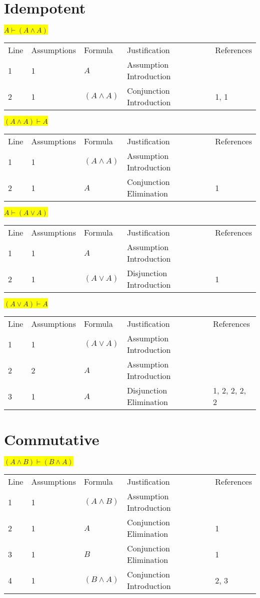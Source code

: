 \documentclass[12pt]{article}
\newcommand{\pr}[1]{\bigbreak \colorbox{Yellow}{$#1$} \smallbreak}
\begin{document}
\begin{flushleft}

\tableofcontents

\clearpage
\section{Idempotent}
\pr{A \vdash(A \land A)}
\begin{tabular}{lllll}
    Line & Assumptions & Formula & Justification & References \\
    1 & 1 & $A$  & Assumption Introduction &  \\
    2 & 1 & $(A\land A)$  & Conjunction Introduction & 1, 1 \\
\end{tabular}

\pr{(A \land A) \vdash A}
\begin{tabular}{lllll}
    Line & Assumptions & Formula & Justification & References \\
    1 & 1 & $(A\land A)$  & Assumption Introduction &  \\
    2 & 1 & $A$  & Conjunction Elimination & 1 \\
\end{tabular}

\pr{A \vdash (A \lor A)}
\begin{tabular}{lllll}
    Line & Assumptions & Formula & Justification & References \\
    1 & 1 & $A$  & Assumption Introduction &  \\
    2 & 1 & $(A\lor A)$  & Disjunction Introduction & 1 \\
\end{tabular}

\pr{(A \lor A) \vdash A}
\begin{tabular}{lllll}
    Line & Assumptions & Formula & Justification & References \\
    1 & 1 & $(A\lor A)$  & Assumption Introduction &  \\
    2 & 2 & $A$  & Assumption Introduction &  \\
    3 & 1 & $A$  & Disjunction Elimination & 1, 2, 2, 2, 2 \\
\end{tabular}

\section{Commutative}
\pr{(A \land B) \vdash (B \land A)}
\begin{tabular}{lllll}
    Line & Assumptions & Formula & Justification & References \\
    1 & 1 & $(A\land B)$  & Assumption Introduction &  \\
    2 & 1 & $A$  & Conjunction Elimination & 1 \\
    3 & 1 & $B$  & Conjunction Elimination & 1 \\
    4 & 1 & $(B\land A)$  & Conjunction Introduction & 2, 3 \\
\end{tabular}


\end{flushleft}
\end{document}
